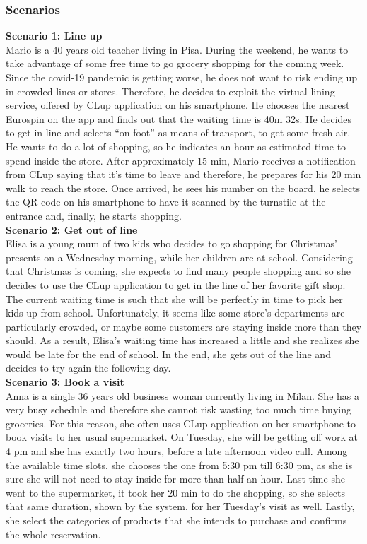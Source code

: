 \documentclass{article}
\begin{document}
\subsubsection{Scenarios}
\medskip
\textbf{Scenario 1: Line up}\medskip\\
Mario is a 40 years old teacher living in Pisa. During the weekend, he wants to take advantage of some free time to go grocery shopping for the coming week. Since the covid-19 pandemic is getting worse, he does not want to risk ending up in crowded lines or stores. Therefore, he decides to exploit the virtual lining service, offered by CLup application on his smartphone. He chooses the nearest Eurospin on the app and finds out that the waiting time is 40m 32s. He decides to get in line and selects “on foot” as means of transport, to get some fresh air. He wants to do a lot of shopping, so he indicates an hour as estimated time to spend inside the store. After approximately 15 min, Mario receives a notification from CLup saying that it’s time to leave and therefore, he prepares for his 20 min walk to reach the store. Once arrived, he sees his number on the board, he selects the QR code on his smartphone to have it scanned by the turnstile at the entrance and, finally, he starts shopping.\medskip\\
\medskip
\textbf{Scenario 2: Get out of line}\medskip\\
Elisa is a young mum of two kids who decides to go shopping for Christmas’ presents on a Wednesday morning, while her children are at school. Considering that Christmas is coming, she expects to find many people shopping and so she decides to use the CLup application to get in the line of her favorite gift shop. The current waiting time is such that she will be perfectly in time to pick her kids up from school. Unfortunately, it seems like some store’s departments are particularly crowded, or maybe some customers are staying inside more than they should. As a result, Elisa’s waiting time has increased a little and she realizes she would be late for the end of school. In the end, she gets out of the line and decides to try again the following day. \medskip\\
\medskip
\textbf{Scenario 3: Book a visit}\medskip\\
Anna is a single 36 years old business woman currently living in Milan. She has a very busy schedule and therefore she cannot risk wasting too much time buying groceries. For this reason, she often uses CLup application on her smartphone to book visits to her usual supermarket. On Tuesday, she will be getting off work at 4 pm and she has exactly two hours, before a late afternoon video call. Among the available time slots, she chooses the one from 5:30 pm till 6:30 pm, as she is sure she will not need to stay inside for more than half an hour. Last time she went to the supermarket, it took her 20 min to do the shopping, so she selects that same duration, shown by the system, for her Tuesday’s visit as well. Lastly, she select the categories of products that she intends to purchase and confirms the whole reservation.\medskip\\
\end{document}
